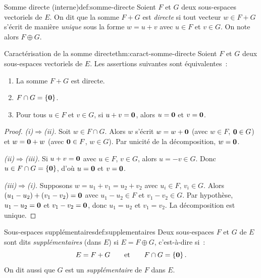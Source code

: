 \begin{definition}{Somme directe (interne)}{def:somme-directe}
  Soient $F$ et $G$ deux sous-espaces vectoriels de $E$. On dit que la
  somme $F+G$ est \emph{directe} si tout vecteur $w\in F+G$ s'écrit de
  manière \emph{unique} sous la forme $w=u+v$ avec $u\in F$ et $v\in G$.
  On note alors $F\oplus G$\index{$\oplus$}.
\end{definition}

\begin{theorem}{Caractérisation de la somme directe}{thm:caract-somme-directe}
  Soient $F$ et $G$ deux sous-espaces vectoriels de $E$. Les assertions
  suivantes sont équivalentes~:
  \begin{enumerate}[label=(\roman*)]
    \item La somme $F+G$ est directe.
    \item $F\cap G = \left\{\mathbf{0}\right\}$.
    \item Pour tous $u\in F$ et $v\in G$, si $u+v=\mathbf{0}$, alors
      $u=\mathbf{0}$ et $v=\mathbf{0}$.
  \end{enumerate}
\end{theorem}

\begin{proof}
  \emph{(i)$\Rightarrow$(ii).} Soit $w\in F\cap G$. Alors $w$
  s'écrit $w=w+\mathbf{0}$ (avec $w\in F$, $\mathbf{0}\in G$) et
  $w=\mathbf{0}+w$ (avec $\mathbf{0}\in F$, $w\in G$). Par unicité de la
  décomposition, $w=\mathbf{0}$.

  \emph{(ii)$\Rightarrow$(iii).} Si $u+v=\mathbf{0}$ avec $u\in F$,
  $v\in G$, alors $u=-v\in G$. Donc $u\in F\cap G=\left\{\mathbf{0}\right\}$, d'où
  $u=\mathbf{0}$ et $v=\mathbf{0}$.

  \emph{(iii)$\Rightarrow$(i).} Supposons $w=u_1+v_1=u_2+v_2$ avec
  $u_i\in F$, $v_i\in G$. Alors
  $(u_1-u_2)+(v_1-v_2)=\mathbf{0}$ avec $u_1-u_2\in F$ et
  $v_1-v_2\in G$. Par hypothèse, $u_1-u_2=\mathbf{0}$ et
  $v_1-v_2=\mathbf{0}$, donc $u_1=u_2$ et $v_1=v_2$. La décomposition est
  unique.
\end{proof}

\begin{definition}{Sous-espaces supplémentaires}{def:supplementaires}
  Deux sous-espaces $F$ et $G$ de $E$ sont dits \emph{supplémentaires}
  (dans $E$) si $E=F\oplus G$, c'est-à-dire si~:
  \[
    E = F+G \qquad\text{et}\qquad F\cap G = \left\{\mathbf{0}\right\}.
  \]
  On dit aussi que $G$ est un \emph{supplémentaire}
  de $F$ dans $E$.
\end{definition}

